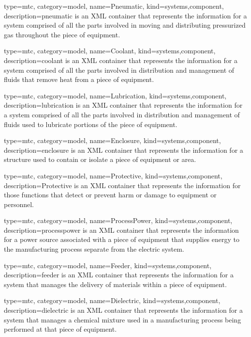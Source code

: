 {
  type=mtc,
  category=model,
  name={Pneumatic},
  kind={systems,component},
  description={\gls{pneumatic} is an XML container that represents the information for a system comprised of all the parts involved in moving and distributing pressurized gas throughout the piece of equipment.}
}


{
  type=mtc,
  category=model,
  name={Coolant},
  kind={systems,component},
  description={\gls{coolant} is an XML container that represents the information for a system comprised of all the parts involved in distribution and management of fluids that remove heat from a piece of equipment.}
}


{
  type=mtc,
  category=model,
  name={Lubrication},
  kind={systems,component},
  description={\gls{lubrication} is an XML container that represents the information for a system comprised of all the parts involved in distribution and management of fluids used to lubricate portions of the piece of equipment.}
}


{
  type=mtc,
  category=model,
  name={Enclosure},
  kind={systems,component},
  description={\gls{enclosure} is an XML container that represents the information for a structure used to contain or isolate a piece of equipment or area.}
}


{
  type=mtc,
  category=model,
  name={Protective},
  kind={systems,component},
  description={Protective is an XML container that represents the information for those functions that detect or prevent harm or damage to equipment or personnel.}
}


{
  type=mtc,
  category=model,
  name={ProcessPower},
  kind={systems,component},
  description={\gls{processpower} is an XML container that represents the information for a power source associated with a piece of equipment that supplies energy to the manufacturing process separate from the \gls{electric} system.}
}


{
  type=mtc,
  category=model,
  name={Feeder},
  kind={systems,component},
  description={\gls{feeder} is an XML container that represents the information for a system that manages the delivery of materials within a piece of equipment. }
}


{
  type=mtc,
  category=model,
  name={Dielectric},
  kind={systems,component},
  description={\gls{dielectric} is an XML container that represents the information for a system that manages a chemical mixture used in a manufacturing process being performed at that piece of equipment.}
}


